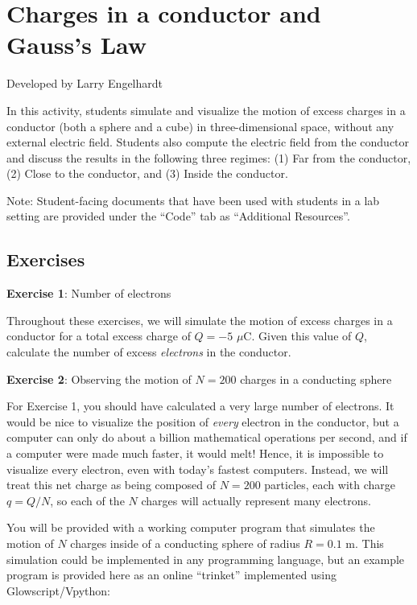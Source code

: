 \documentclass[]{article}
\date{}
\begin{document}
\section{Charges in a conductor and Gauss's
Law}\label{charges-in-a-conductor-and-gausss-law}

Developed by Larry Engelhardt

In this activity, students simulate and visualize the motion of excess
charges in a conductor (both a sphere and a cube) in three-dimensional
space, without any external electric field. Students also compute the
electric field from the conductor and discuss the results in the
following three regimes: (1) Far from the conductor, (2) Close to the
conductor, and (3) Inside the conductor.

Note: Student-facing documents that have been used with students in a
lab setting are provided under the ``Code'' tab as ``Additional
Resources''.

\subsection{Exercises}\label{exercises}

\textbf{Exercise 1}: Number of electrons

Throughout these exercises, we will simulate the motion of excess
charges in a conductor for a total excess charge of \(Q = -5\) \(\mu\)C.
Given this value of \(Q\), calculate the number of excess
\emph{electrons} in the conductor.

\textbf{Exercise 2}: Observing the motion of \(N = 200\) charges in a
conducting sphere

For Exercise 1, you should have calculated a very large number of
electrons. It would be nice to visualize the position of \emph{every}
electron in the conductor, but a computer can only do about a billion
mathematical operations per second, and if a computer were made much
faster, it would melt! Hence, it is impossible to visualize every
electron, even with today's fastest computers. Instead, we will treat
this net charge as being composed of \(N = 200\) particles, each with
charge \(q = Q/N\), so each of the \(N\) charges will actually represent
many electrons.

You will be provided with a working computer program that simulates the
motion of \(N\) charges inside of a conducting sphere of radius
\(R = 0.1\) m. This simulation could be implemented in any programming
language, but an example program is provided here as an online
``trinket'' implemented using Glowscript/Vpython:
\end{document}
